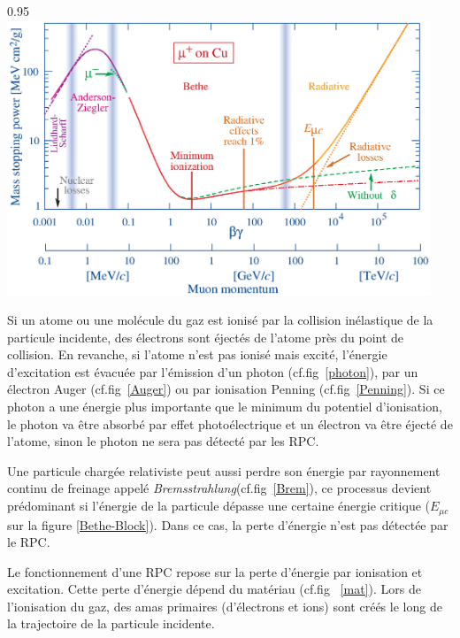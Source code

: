 \begin{minipagewithmarginpars}[h]{0.95\textwidth}
	\centering
	\includegraphics[width=0.95\textwidth]{RPC/Bethe-Bloch.eps}
	\label{Bethe-Block}
\end{minipagewithmarginpars}

Si un atome ou une molécule du gaz est ionisé par la collision inélastique de la particule incidente, des électrons sont éjectés de l'atome près du point de collision. En revanche, si l'atome n'est pas ionisé mais excité, l'énergie d'excitation est évacuée par l'émission d'un photon (cf.fig~\ref{photon}), par un électron Auger (cf.fig~\ref{Auger}) ou par ionisation Penning (cf.fig~\ref{Penning}). Si ce photon a une énergie plus importante que le minimum du potentiel d'ionisation, le photon va être absorbé par effet photoélectrique et un électron va être éjecté de l'atome, sinon le photon ne sera pas détecté par les RPC.

Une particule chargée relativiste peut aussi perdre son énergie par rayonnement continu de freinage appelé \textit{Bremsstrahlung}(cf.fig~\ref{Brem}), ce processus devient prédominant si l'énergie de la particule dépasse une certaine énergie critique ($E_{\mu c}$ sur la figure \ref{Bethe-Block}). Dans ce cas, la perte d'énergie n'est pas détectée par le RPC.

Le fonctionnement d'une RPC repose sur la perte d'énergie par ionisation et excitation. Cette perte d'énergie dépend du matériau (cf.fig~ \ref{mat}). Lors de l'ionisation du gaz, des amas primaires (d'électrons et ions) sont créés le long de la trajectoire de la particule incidente. 


